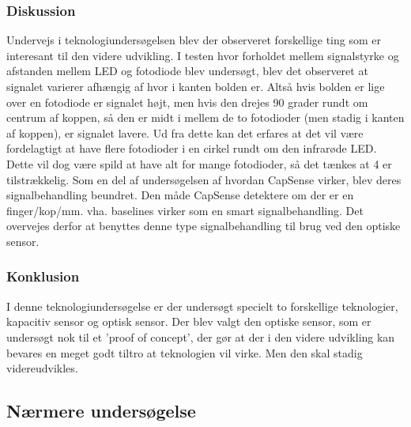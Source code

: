 \documentclass[HardwareDesign/HardwareDesign_main.tex]{subfiles}
\begin{document}
\subsubsection{Diskussion} \label{sec:CupSensorTekUnderDiskussion}
Undervejs i teknologiundersøgelsen blev der observeret forskellige ting som er interesant til den videre udvikling. 
I testen hvor forholdet mellem signalstyrke og afstanden mellem LED og fotodiode blev undersøgt, blev det observeret at signalet varierer afhængig af hvor i kanten bolden er. Altså hvis bolden er lige over en fotodiode er signalet højt, men hvis den drejes 90 grader rundt om centrum af koppen, så den er midt i mellem de to fotodioder (men stadig i kanten af koppen), er signalet lavere. Ud fra dette kan det erfares at det vil være fordelagtigt at have flere fotodioder i en cirkel rundt om den infrarøde LED. Dette vil dog være spild at have alt for mange fotodioder, så det tænkes at 4 er tilstrækkelig.
Som en del af undersøgelsen af hvordan CapSense virker, blev deres signalbehandling beundret. Den måde CapSense detektere om der er en finger/kop/mm. vha. baselines virker som en smart signalbehandling. Det overvejes derfor at benyttes denne type signalbehandling til brug ved den optiske sensor.

\subsubsection{Konklusion} \label{sec:CupSensorTekUnderKonklusion}
I denne teknologiundersøgelse er der undersøgt specielt to forskellige teknologier, kapacitiv sensor og optisk sensor. Der blev valgt den optiske sensor, som er undersøgt nok til et 'proof of concept', der gør at der i den videre udvikling kan bevares en meget godt tiltro at teknologien vil virke. Men den skal stadig videreudvikles.

\iffalse
\subsection{Nærmere undersøgelse}
\end{document}
